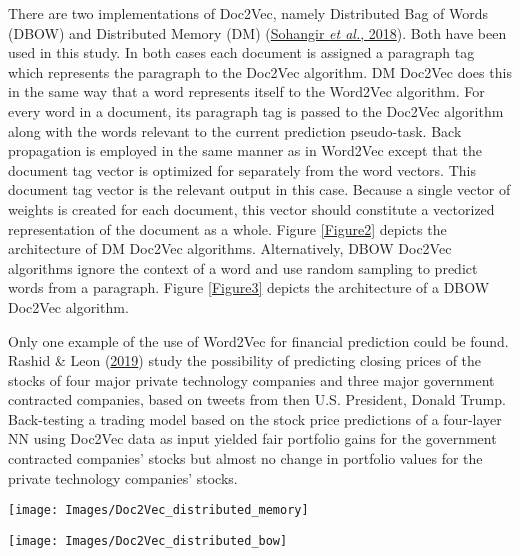 \documentclass[11pt,preprint, authoryear]{elsarticle}
\let\origfigure\figure
\let\endorigfigure\endfigure
\renewenvironment{figure}[1][2] {
    \expandafter\origfigure\expandafter[H]
} {
    \endorigfigure
}
\numberwithin{equation}{section}
\numberwithin{figure}{section}
\numberwithin{table}{section}
\begin{document}
There are two implementations of Doc2Vec, namely Distributed Bag of
Words (DBOW) and Distributed Memory (DM)
(\protect\hyperlink{ref-sohangir2018financial}{Sohangir \emph{et al.},
2018}). Both have been used in this study. In both cases each document
is assigned a paragraph tag which represents the paragraph to the
Doc2Vec algorithm. DM Doc2Vec does this in the same way that a word
represents itself to the Word2Vec algorithm. For every word in a
document, its paragraph tag is passed to the Doc2Vec algorithm along
with the words relevant to the current prediction pseudo-task. Back
propagation is employed in the same manner as in Word2Vec except that
the document tag vector is optimized for separately from the word
vectors. This document tag vector is the relevant output in this case.
Because a single vector of weights is created for each document, this
vector should constitute a vectorized representation of the document as
a whole. Figure \ref{Figure2} depicts the architecture of DM Doc2Vec
algorithms. Alternatively, DBOW Doc2Vec algorithms ignore the context of
a word and use random sampling to predict words from a paragraph. Figure
\ref{Figure3} depicts the architecture of a DBOW Doc2Vec algorithm.

Only one example of the use of Word2Vec for financial prediction could
be found. Rashid \& Leon
(\protect\hyperlink{ref-rashid2019making}{2019}) study the possibility
of predicting closing prices of the stocks of four major private
technology companies and three major government contracted companies,
based on tweets from then U.S. President, Donald Trump. Back-testing a
trading model based on the stock price predictions of a four-layer NN
using Doc2Vec data as input yielded fair portfolio gains for the
government contracted companies' stocks but almost no change in
portfolio values for the private technology companies' stocks.

\begin{figure}[H]

{\centering \texttt{[image: Images/Doc2Vec\_distributed\_memory]}

}

\caption{Doc2Vec model - distributed memory architecture: dm = 1 \label{Figure2}}\label{fig:Doc2Vec DM}
\end{figure}

\begin{figure}[H]

{\centering \texttt{[image: Images/Doc2Vec\_distributed\_bow]}

}

\caption{Doc2Vec model - distributed bag-of-words architecture: dm = 0 \label{Figure3}}\label{fig:Doc2Vec DBOW}
\end{figure}
\end{document}
